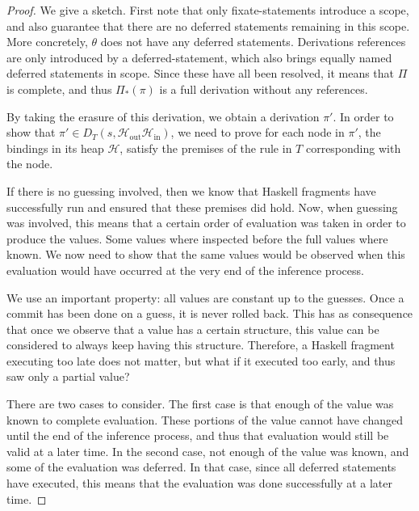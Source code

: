 \documentclass[preprint,natbib]{sigplanconf}
\newcommand\SchemeName{s}
\newcommand\In{\mbox{in}}
\newcommand\Out{\mbox{out}}
\newcommand\Heap{\mathcal{H}}
\newcommand\Substitution{\theta}
\newcommand\Deriv{\pi}
\newcommand\DerivsEnv{\Pi}
\begin{document}
  \begin{proof}
  We give a sketch. First note that only fixate-statements introduce a scope, and also guarantee that there are no deferred
  statements remaining in this scope. More concretely, $\Substitution$ does not have any deferred statements. Derivations
  references are only introduced by a deferred-statement, which also brings equally named deferred statements in scope.
  Since these have all been resolved, it means that $\DerivsEnv$ is complete, and thus $\DerivsEnv_{*}(\Deriv)$ is a full
  derivation without any references.
  
  By taking the erasure of this derivation, we obtain a derivation $\Deriv'$. In order to show that
  $\Deriv' \in D_T(\SchemeName, \Heap_{\Out} \Heap_{\In})$, we need to prove for each node in $\Deriv'$,
  the bindings in its heap $\Heap$, satisfy the premises of the rule in $T$ corresponding with the node.
  
  If there is no guessing involved, then we know that Haskell fragments have successfully run and ensured that these
  premises did hold. Now, when guessing was involved, this means that a certain order of evaluation was taken in order
  to produce the values. Some values where inspected before the full values where known. We now need to show that the
  same values would be observed when this evaluation would have occurred at the very end of the inference process.

  We use an important property: all values are constant up to the guesses. Once a commit has been done on
  a guess, it is never rolled back. This has as consequence that once we observe that a value has a certain structure, this
  value can be considered to always keep having this structure. Therefore, a Haskell fragment executing too late does not
  matter, but what if it executed too early, and thus saw only a partial value?

  There are two cases to consider. The first case is that enough of the value was known to complete evaluation. These portions of the
  value cannot have changed until the end of the inference process, and thus that evaluation would still be valid at a
  later time. In the second case, not enough of the value was known, and some of the evaluation was deferred. In that case,
  since all deferred statements have executed, this means that the evaluation was done successfully at a later time.
  \end{proof}
  
\end{document}
